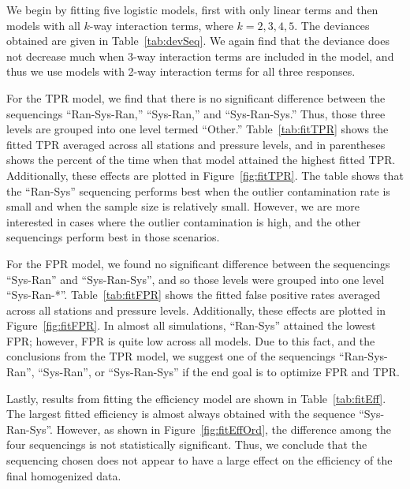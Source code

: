 \documentclass[12pt]{article}
\begin{document}
\begin{doublespacing}
We begin by fitting five logistic models, first with only linear terms and then models with all $k$-way interaction terms, where $k=2,3,4,5$.  The deviances obtained are given in Table~\ref{tab:devSeq}.  We again find that the deviance does not decrease much when 3-way interaction terms are included in the model, and thus we use models with 2-way interaction terms for all three responses.

For the TPR model, we find that there is no significant difference between the sequencings ``Ran-Sys-Ran,'' ``Sys-Ran,'' and ``Sys-Ran-Sys.''  Thus, those three levels are grouped into one level termed ``Other.''  Table~\ref{tab:fitTPR} shows the fitted TPR averaged across all stations and pressure levels, and in parentheses shows the percent of the time when that model attained the highest fitted TPR.  Additionally, these effects are plotted in Figure~\ref{fig:fitTPR}.  The table shows that the ``Ran-Sys'' sequencing performs best when the outlier contamination rate is small and when the sample size is relatively small.  However, we are more interested in cases where the outlier contamination is high, and the other sequencings perform best in those scenarios.

For the FPR model, we found no significant difference between the sequencings ``Sys-Ran'' and ``Sys-Ran-Sys'', and so those levels were grouped into one level ``Sys-Ran-*''.  Table~\ref{tab:fitFPR} shows the fitted false positive rates averaged across all stations and pressure levels.  Additionally, these effects are plotted in Figure~\ref{fig:fitFPR}.  In almost all simulations, ``Ran-Sys'' attained the lowest FPR; however, FPR is quite low across all models.  Due to this fact, and the conclusions from the TPR model, we suggest one of the sequencings ``Ran-Sys-Ran'', ``Sys-Ran'', or ``Sys-Ran-Sys'' if the end goal is to optimize FPR and TPR.

Lastly, results from fitting the efficiency model are shown in Table~\ref{tab:fitEff}.  The largest fitted efficiency is almost always obtained with the sequence ``Sys-Ran-Sys''.  However, as shown in Figure~\ref{fig:fitEffOrd}, the difference among the four sequencings is not statistically significant.  Thus, we conclude that the sequencing chosen does not appear to have a large effect on the efficiency of the final homogenized data.



\end{doublespacing}
\end{document}
